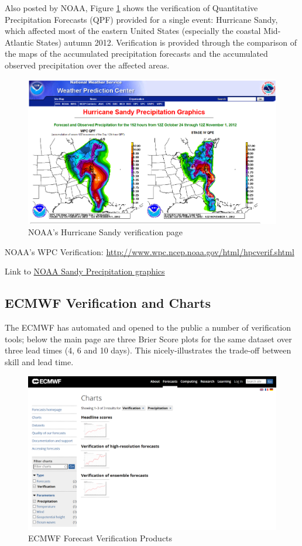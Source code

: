 \documentclass[logos,parttoc,morelanguage=french,morelanguage=german,draft]{orsay-memoire}
\begin{document}
Also posted by NOAA, Figure \ref{fig:noaaSandy} shows the verification of Quantitative Precipitation Forecasts (QPF) provided for a single event: Hurricane Sandy, which affected most of the eastern United States (especially the coastal Mid-Atlantic States) autumn 2012. Verification is provided through the comparison of the maps of the accumulated precipitation forecasts and the accumulated observed precipitation over the affected areas.

\begin{figure}[H]
\centering
\includegraphics[width=0.70\linewidth]{images/noaaSandy.png}
  \caption{NOAA's Hurricane Sandy verification page}
  \label{fig:noaaSandy}
\end{figure}


NOAA's WPC Verification: \href{http://www.wpc.ncep.noaa.gov/html/hpcverif.shtml}{http://www.wpc.ncep.noaa.gov/html/hpcverif.shtml}

Link to \href{http://www.wpc.ncep.noaa.gov/tropical/case_studies/sandy_2012/sandyprecip.php}{NOAA Sandy Precipitation graphics}

\subsection*{ECMWF Verification and Charts}
The ECMWF has automated and opened to the public a number of verification tools; below the main page are three Brier Score plots for the same dataset over three lead times (4, 6 and 10 days). This nicely-illustrates the trade-off between skill and lead time.

\begin{figure}[hp]
\centering
\includegraphics[width=0.7\linewidth]{images/exempleECMWFverifselect.png}
  \caption{ECMWF Forecast Verification Products}
  \label{fig:exECMWFverificationpage}
\end{figure}
\end{document}
